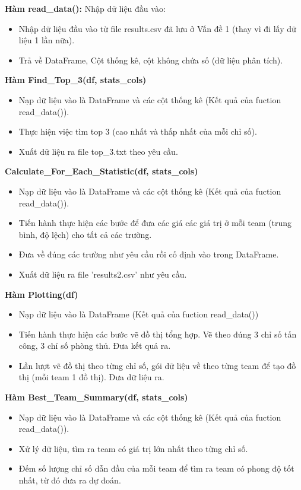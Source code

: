 \documentclass[12pt]{report}
\begin{document}
{\textbf* {Hàm read\_data():} Nhập dữ liệu đầu vào:
\begin{itemize}
	\item Nhập dữ liệu đầu vào từ file results.csv đã lưu ở Vấn đề 1 (thay vì đi lấy dữ liệu 1 lần nữa).
	\item Trả về DataFrame, Cột thống kê, cột không chứa số (dữ liệu phân tích). 
\end{itemize}

\textbf* {Hàm Find\_Top\_3(df, stats\_cols)}
\begin{itemize}
	\item Nạp dữ liệu vào là DataFrame và các cột thống kê (Kết quả của fuction read\_data()).
	\item Thực hiện việc tìm top 3 (cao nhất và thấp nhất của mỗi chỉ số).
	\item Xuất dữ liệu ra file top\_3.txt theo yêu cầu.
\end{itemize}

\textbf* {Calculate\_For\_Each\_Statistic(df, stats\_cols)}
\begin{itemize}
	\item Nạp dữ liệu vào là DataFrame và các cột thống kê (Kết quả của fuction read\_data()).
	\item Tiến hành thực hiện các bước để đưa các giá các giá trị ở mỗi team (trung bình, độ lệch) cho tất cả các trường.
	\item Đưa về đúng các trường như yêu cầu rồi cố định vào trong DataFrame.
	\item Xuất dữ liệu ra file 'results2.csv' như yêu cầu.
\end{itemize}

\textbf* {Hàm Plotting(df)}
\begin{itemize}
	\item Nạp dữ liệu vào là DataFrame (Kết quả của fuction read\_data())
	\item Tiến hành thực hiện các bước vẽ đồ thị tổng hợp. Vẽ theo đúng 3 chỉ số tấn công, 3 chỉ số phòng thủ. Đưa kết quả ra.
	\item Lần lượt vẽ đồ thị theo từng chỉ số, gói dữ liệu về theo từng team để tạo đồ thị (mỗi team 1 đồ thị). Đưa dữ liệu ra.
\end{itemize}

\textbf* {Hàm Best\_Team\_Summary(df, stats\_cols)}
\begin{itemize}
	\item Nạp dữ liệu vào là DataFrame và các cột thống kê (Kết quả của fuction read\_data()).
	\item Xử lý dữ liệu, tìm ra team có giá trị lớn nhất theo từng chỉ số.
	\item Đếm số lượng chỉ số dẫn đầu của mỗi team để tìm ra team có phong độ tốt nhất, từ đó đưa ra dự đoán.
\end{itemize}

}
\end{document}
